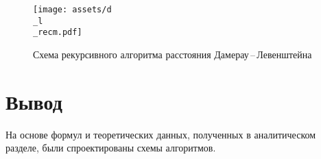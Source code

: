 \begin{figure}[!ht]
	\begin{center}
		\texttt{[image: assets/d\\\_l\\\_recm.pdf]}
	\end{center}
	
	\caption{Схема рекурсивного алгоритма расстояния Дамерау\,--\,Левенштейна}
	\label{fig:damerau-rec}
\end{figure}



\section{Вывод}
На основе формул и теоретических данных, полученных в аналитическом разделе, были спроектированы схемы алгоритмов.